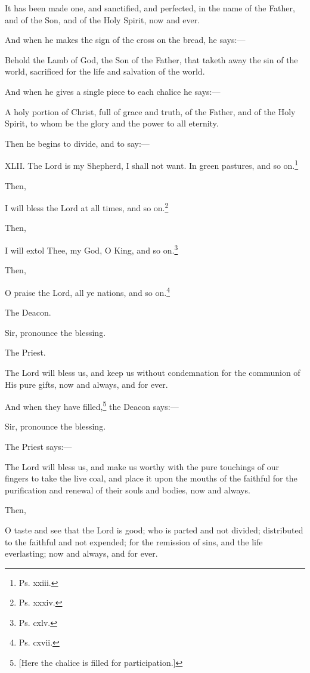 It has been made one, and sanctified, and perfected, in the name of the Father, and of the Son, and of the Holy Spirit, now and ever.

And when he makes the sign of the cross on the bread, he says:—

Behold the Lamb of God, the Son of the Father, that taketh away the sin of the world, sacrificed for the life and salvation of the world.

And when he gives a single piece to each chalice he says:—

A holy portion of Christ, full of grace and truth, of the Father, and of the Holy Spirit, to whom be the glory and the power to all eternity.

Then he begins to divide, and to say:—

XLII. The Lord is my Shepherd, I shall not want. In green pastures, and so on.\footnote{\par  Ps. xxiii.}

Then,

I will bless the Lord at all times, and so on.\footnote{\par  Ps. xxxiv.}

Then,

I will extol Thee, my God, O King, and so on.\footnote{\par  Ps. cxlv.}

Then,

O praise the Lord, all ye nations, and so on.\footnote{\par  Ps. cxvii.}

The Deacon.

Sir, pronounce the blessing.

The Priest.

The Lord will bless us, and keep us without condemnation for the communion of His pure gifts, now and always, and for ever.

And when they have filled,\footnote{\par{}  [Here the chalice is filled for participation.]} the Deacon says:—

Sir, pronounce the blessing.

The Priest says:—

The Lord will bless us, and make us worthy with the pure touchings of our fingers to take the live coal, and place it upon the mouths of the faithful for the purification and renewal of their souls and bodies, now and always.

Then,

O taste and see that the Lord is good; who is parted and not divided; distributed to the faithful and not expended; for the remission of sins, and the life everlasting; now and always, and for ever.

